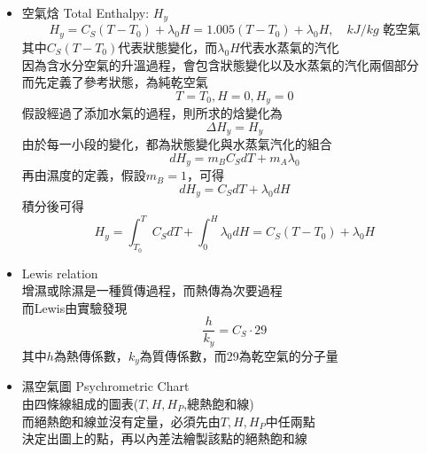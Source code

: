 \documentclass[../main.tex]{subfiles}
\begin{document}
\begin{itemize}
\begin{equation}
    \frac{V_H}{22.41} = \frac{T}{273.15}\left(\frac{1}{29}+\frac{H}{18}\right)
  \end{equation}
  \item 空氣焓 Total Enthalpy: $H_y$
  \begin{equation}
    H_y = C_S(T-T_0) + \lambda_0 H = 1.005(T-T_0) +  \lambda_0 H,\quad kJ/kg\text{ 乾空氣}
  \end{equation}
  其中$C_S(T-T_0)$代表狀態變化，而$\lambda_0 H$代表水蒸氣的汽化\\
  因為含水分空氣的升溫過程，會包含狀態變化以及水蒸氣的汽化兩個部分\\
  而先定義了參考狀態，為純乾空氣
  \begin{equation}
    T = T_0, H=0, H_y = 0
  \end{equation}
  假設經過了添加水氣的過程，則所求的焓變化為
  \begin{equation}
    \Delta H_y = H_y
  \end{equation}
  由於每一小段的變化，都為狀態變化與水蒸氣汽化的組合
  \begin{equation}
    dH_y = m_BC_SdT + m_A\lambda_0
  \end{equation}
  再由濕度的定義，假設$m_B=1$，可得
  \begin{equation}
    dH_y = C_SdT + \lambda_0 dH
  \end{equation}
  積分後可得
  \begin{equation}
    H_y = \int_{T_0}^{T} C_S dT + \int_{0}^{H} \lambda_0 dH = C_S(T-T_0) + \lambda_0 H
  \end{equation}
  \item Lewis relation\\
  增濕或除濕是一種質傳過程，而熱傳為次要過程\\
  而Lewis由實驗發現
  \begin{equation}
    \boxed{\frac{h}{k_y} = C_S\cdot 29}
  \end{equation}
  其中$h$為熱傳係數，$k_y$為質傳係數，而29為乾空氣的分子量
  \item 濕空氣圖 Psychrometric Chart\\
  由四條線組成的圖表($T,H,H_P$,總熱飽和線)\\
  而絕熱飽和線並沒有定量，必須先由$T,H,H_P$中任兩點\\
  決定出圖上的點，再以內差法繪製該點的絕熱飽和線
  \begin{figure}[H]
    \centering
\end{figure}
\end{itemize}
\end{document}
